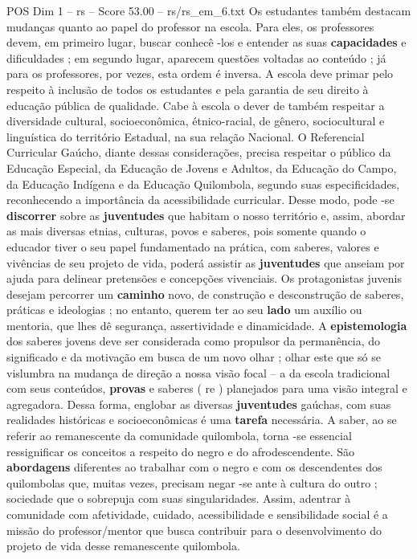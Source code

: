\begin{textsample}{POS Dim 1 – rs – Score 53.00 – rs/rs\_em\_6.txt}
Os estudantes também destacam mudanças quanto ao papel do professor na escola.
Para eles, os professores devem, em primeiro lugar, buscar conhecê -los e entender as suas \textbf{capacidades} e dificuldades ; em segundo lugar, aparecem questões voltadas ao conteúdo ; já para os professores, por vezes, esta ordem é inversa.
A escola deve primar pelo respeito à inclusão de todos os estudantes e pela garantia de seu direito à educação pública de qualidade.
Cabe à escola o dever de também respeitar a diversidade cultural, socioeconômica, étnico-racial, de gênero, sociocultural e linguística do território Estadual, na sua relação Nacional.
O Referencial Curricular Gaúcho, diante dessas considerações, precisa respeitar o público da Educação Especial, da Educação de Jovens e Adultos, da Educação do Campo, da Educação Indígena e da Educação Quilombola, segundo suas especificidades, reconhecendo a importância da acessibilidade curricular.
Desse modo, pode -se \textbf{discorrer} sobre as \textbf{juventudes} que habitam o nosso território e, assim, abordar as mais diversas etnias, culturas, povos e saberes, pois somente quando o educador tiver o seu papel fundamentado na prática, com saberes, valores e vivências de seu projeto de vida, poderá assistir as \textbf{juventudes} que anseiam por ajuda para delinear pretensões e concepções vivenciais.
Os protagonistas juvenis desejam percorrer um \textbf{caminho} novo, de construção e desconstrução de saberes, práticas e ideologias ; no entanto, querem ter ao seu \textbf{lado} um auxílio ou mentoria, que lhes dê segurança, assertividade e dinamicidade.
A \textbf{epistemologia} dos saberes jovens deve ser considerada como propulsor da permanência, do significado e da motivação em busca de um novo olhar ; olhar este que só se vislumbra na mudança de direção a nossa visão focal – a da escola tradicional com seus conteúdos, \textbf{provas} e saberes ( re ) planejados para uma visão integral e agregadora.
Dessa forma, englobar as diversas \textbf{juventudes} gaúchas, com suas realidades históricas e socioeconômicas é uma \textbf{tarefa} necessária.
A saber, ao se referir ao remanescente da comunidade quilombola, torna -se essencial ressignificar os conceitos a respeito do negro e do afrodescendente.
São \textbf{abordagens} diferentes ao trabalhar com o negro e com os descendentes dos quilombolas que, muitas vezes, precisam negar -se ante à cultura do outro ; sociedade que o sobrepuja com suas singularidades.
Assim, adentrar à comunidade com afetividade, cuidado, acessibilidade e sensibilidade social é a missão do professor/mentor que busca contribuir para o desenvolvimento do projeto de vida desse remanescente quilombola.

\end{textsample}
